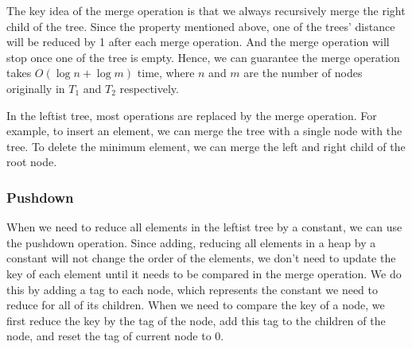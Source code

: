 \documentclass[a4paper,12pt]{article}
\begin{document}
The key idea of the merge operation is that we always recursively merge the right child of the tree.
Since the property mentioned above, one of the trees' distance will be reduced by 1 after each merge operation.
And the merge operation will stop once one of the tree is empty.
Hence, we can guarantee the merge operation takes $O(\log n + \log m)$ time, where $n$ and $m$ are the number of nodes originally in $T_1$ and $T_2$ respectively.

In the leftist tree, most operations are replaced by the merge operation.
For example, to insert an element, we can merge the tree with a single node with the tree.
To delete the minimum element, we can merge the left and right child of the root node.

\subsubsection*{Pushdown}

When we need to reduce all elements in the leftist tree by a constant, we can use the pushdown operation.
Since adding, reducing all elements in a heap by a constant will not change the order of the elements, we don't need to update the key of each element until it needs to be compared in the merge operation.
We do this by adding a tag to each node, which represents the constant we need to reduce for all of its children.
When we need to compare the key of a node, we first reduce the key by the tag of the node, add this tag to the children of the node, and reset the tag of current node to 0.

\begin{center}
\end{center}

\begin{center}
\end{center}
\end{document}
